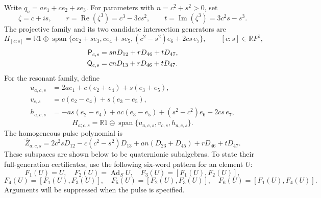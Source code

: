 \documentclass[11pt,a4paper]{article}
\newcommand{\RR}{\mathbb R}
\newcommand{\Ad}{\operatorname{Ad}}
\newcommand{\Span}{\operatorname{span}}
\begin{document}
Write $q_a=ae_1+ce_2+se_3$.  For parameters with $n=c^2+s^2>0$, set
\[
\zeta=c+is,\qquad r=\operatorname{Re}(\zeta^3)=c^3-3cs^2,
\qquad t=\operatorname{Im}(\zeta^3)=3c^2s-s^3.
\]
The projective family and its two candidate intersection generators are
\begin{equation}
H_{[c:s]}=\RR1\oplus\Span\{ce_2+se_3,ce_4+se_5,(c^2-s^2)e_6+2cs\,e_7\},
\qquad[c:s]\in\RR P^1,
\label{eq:projective-context-family}
\end{equation}
\begin{align}
\mathsf P_{c,s}&=snD_{12}+rD_{46}+tD_{47},\notag\\
\mathsf Q_{c,s}&=cnD_{13}+rD_{46}+tD_{47}.
\label{eq:projective-intersection-basis}
\end{align}
For the resonant family, define
\begin{align*}
u_{a,c,s}&=2ae_1+c(e_2+e_4)+s(e_3+e_5),\\
v_{c,s}&=c(e_2-e_4)+s(e_3-e_5),\\
h_{a,c,s}&=-as(e_2-e_4)+ac(e_3-e_5)+(s^2-c^2)e_6-2cs\,e_7,
\end{align*}
\begin{equation}
H_{a;c,s}=\RR1\oplus\Span\{u_{a,c,s},v_{c,s},h_{a,c,s}\}.
\label{eq:resonant-context-family}
\end{equation}
The homogeneous pulse polynomial is
\[
\widehat Z_{a;c,s}
=2c^2sD_{12}-c(c^2-s^2)D_{13}
 +an(D_{23}+D_{45})+rD_{46}+tD_{47}.
\]
These subspaces are shown below to be quaternionic subalgebras.  To state their
full-generation certificates, use the following six-word pattern for an element $U$:
\[
F_1(U)=U,\quad F_2(U)=\Ad_SU,\quad F_3(U)=[F_1(U),F_2(U)],
\]
\[
F_4(U)=[F_1(U),F_3(U)],\quad
F_5(U)=[F_2(U),F_3(U)],\quad
F_6(U)=[F_1(U),F_4(U)].
\]
Arguments will be suppressed when the pulse is specified.
\end{document}
